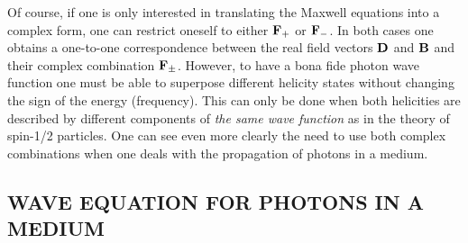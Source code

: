 \documentclass[11pt]{article}
\begin{document}
Of course, if one is only interested in translating the Maxwell equations
into a complex form, one can restrict oneself to either ${\bf F}_+$ or ${\bf
F}_-$. In both cases one obtains a one-to-one correspondence between the
real field vectors ${\bf D}$ and ${\bf B}$ and their complex combination
${\bf F}_{\pm}$. However, to have a bona fide photon wave function one must
be able to superpose different helicity states without changing the sign of
the energy (frequency). This can only be done when both helicities are
described by different components of {\em the same wave function} as in the
theory of spin-1/2 particles. One can see even more clearly the need to use both
complex combinations when one deals with the propagation of photons in a
medium.

\subsection[WAVE EQUATION IN A MEDIUM]{WAVE EQUATION FOR PHOTONS IN A
MEDIUM}
\end{document}
